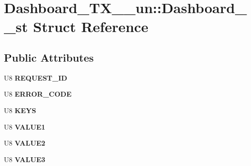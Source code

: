 \hypertarget{struct_dashboard___t_x__10__un_1_1_dashboard__10__st}{\section{Dashboard\-\_\-\-T\-X\-\_\-\_\-un\-:\-:Dashboard\-\_\-\_\-st Struct Reference}
\label{struct_dashboard___t_x__10__un_1_1_dashboard__10__st}
}
\subsection*{Public Attributes}
\begin{DoxyCompactItemize}
\item 
\hypertarget{struct_dashboard___t_x__10__un_1_1_dashboard__10__st_a626169737fa3a6b600d894003e50771d}{U8 {\bfseries R\-E\-Q\-U\-E\-S\-T\-\_\-\-I\-D}}\label{struct_dashboard___t_x__10__un_1_1_dashboard__10__st_a626169737fa3a6b600d894003e50771d}

\item 
\hypertarget{struct_dashboard___t_x__10__un_1_1_dashboard__10__st_a566af8526e7e70c091bfe843cfa5f867}{U8 {\bfseries E\-R\-R\-O\-R\-\_\-\-C\-O\-D\-E}}\label{struct_dashboard___t_x__10__un_1_1_dashboard__10__st_a566af8526e7e70c091bfe843cfa5f867}

\item 
\hypertarget{struct_dashboard___t_x__10__un_1_1_dashboard__10__st_ab09ab2055f6eb87ce7a762af3f50c4ea}{U8 {\bfseries K\-E\-Y\-S}}\label{struct_dashboard___t_x__10__un_1_1_dashboard__10__st_ab09ab2055f6eb87ce7a762af3f50c4ea}

\item 
\hypertarget{struct_dashboard___t_x__10__un_1_1_dashboard__10__st_ada53ef594d1739c6a9cc5e58d5a44801}{U8 {\bfseries V\-A\-L\-U\-E1}}\label{struct_dashboard___t_x__10__un_1_1_dashboard__10__st_ada53ef594d1739c6a9cc5e58d5a44801}

\item 
\hypertarget{struct_dashboard___t_x__10__un_1_1_dashboard__10__st_a999a5f828d5f613f122e01fe88aa0538}{U8 {\bfseries V\-A\-L\-U\-E2}}\label{struct_dashboard___t_x__10__un_1_1_dashboard__10__st_a999a5f828d5f613f122e01fe88aa0538}

\item 
\hypertarget{struct_dashboard___t_x__10__un_1_1_dashboard__10__st_aa8a3b03196aad3afe8e3ad3fc4d8f2a8}{U8 {\bfseries V\-A\-L\-U\-E3}}\label{struct_dashboard___t_x__10__un_1_1_dashboard__10__st_aa8a3b03196aad3afe8e3ad3fc4d8f2a8}


\end{DoxyCompactItemize}
